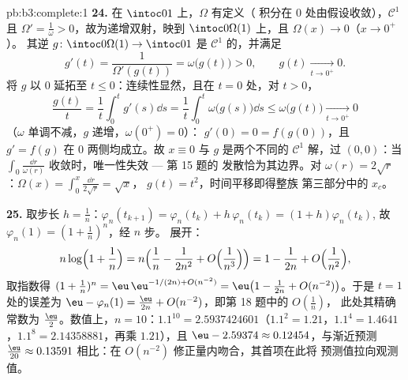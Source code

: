 \begin{solution}{pb:b3:complete:1}
\textbf{24.} 在 $\intoc01$ 上，$\Omega$ 有定义（
积分在 $0$ 处由假设收敛），$\mathcal C^1$ 且
$\Omega' = \frac1\omega > 0$，故为递增双射，映到
$\intoc0{\Omega(1)}$ 上，且 $\Omega(x) \to 0$（$x \to 0^+$）。
其逆 $g \colon \intoc0{\Omega(1)} \to \intoc01$ 是
$\mathcal C^1$ 的，并满足
\[
g'(t) = \frac1{\Omega'(g(t))} = \omega\bigl(g(t)\bigr) > 0,
\qquad g(t) \xrightarrow[t \to 0^+]{} 0 .
\]
将 $g$ 以 $0$ 延拓至 $t \leq 0$：连续性显然，且在
$t = 0$ 处，对 $t > 0$，
\[
\frac{g(t)}t = \frac1t\int_0^tg'(s)\dd s
= \frac1t\int_0^t\omega\bigl(g(s)\bigr)\dd s
\leq \omega\bigl(g(t)\bigr) \xrightarrow[t\to0^+]{} 0
\]
（$\omega$ 单调不减，$g$ 递增，$\omega(0^+) = 0$）：
$g'(0) = 0 = f(g(0))$，且 $g' = f(g)$ 在
$0$ 两侧均成立。故 $x \equiv 0$ 与 $g$ 是两个不同的 $\mathcal
C^1$ 解，过 $(0, 0)$：当 $\int_0\frac{\dd r}
{\omega(r)}$ 收敛时，唯一性失效 --- 第 15 题的
发散恰为其边界。对 $\omega(r) = 2\sqrt
r$：$\Omega(x) = \int_0^x\frac{\dd r}{2\sqrt r} = \sqrt x$，
$g(t) = t^2$，时间平移即得整族
第三部分中的 $x_c$。

\textbf{25.} 取步长 $h = \frac1n$：$\varphi_n(t_{k+1}) =
\varphi_n(t_k) + h\,\varphi_n(t_k) = (1 + h)\varphi_n(t_k)$,
故 $\varphi_n(1) = (1 + \frac1n)^n$，经 $n$ 步。
展开：
\[
n\log\Bigl(1 + \frac1n\Bigr)
= n\Bigl(\frac1n - \frac1{2n^2} + O\Bigl(\frac1{n^3}\Bigr)
\Bigr) = 1 - \frac1{2n} + O\Bigl(\frac1{n^2}\Bigr),
\]
取指数得 $(1 + \frac1n)^n = \eu\,\eu^{-1/(2n) +
O(n^{-2})} = \eu\bigl(1 - \frac1{2n} + O(n^{-2})\bigr)$。于是
$t = 1$ 处的误差为 $\eu - \varphi_n(1) =
\frac{\eu}{2n} + O(n^{-2})$，即第 18 题中的 $O(\frac1n)$，
此处其精确常数为 $\frac\eu2$。数值上，$n =
10$：$1.1^{10} = 2.5937424601$（$1.1^2 = 1.21$，$1.1^4 =
1.4641$，$1.1^8 = 2.14358881$，再乘 $1.21$），且 $\eu -
2.59374 \approx 0.12454$，与渐近预测
$\frac{\eu}{20} \approx 0.13591$ 相比：在
$O(n^{-2})$ 修正量内吻合，其首项在此将
预测值拉向观测值。
\end{solution}
